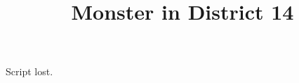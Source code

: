 \documentclass[11pt]{article}
\begin{document}
\title{Monster in District 14}
\maketitle
Script lost.
\end{document}
